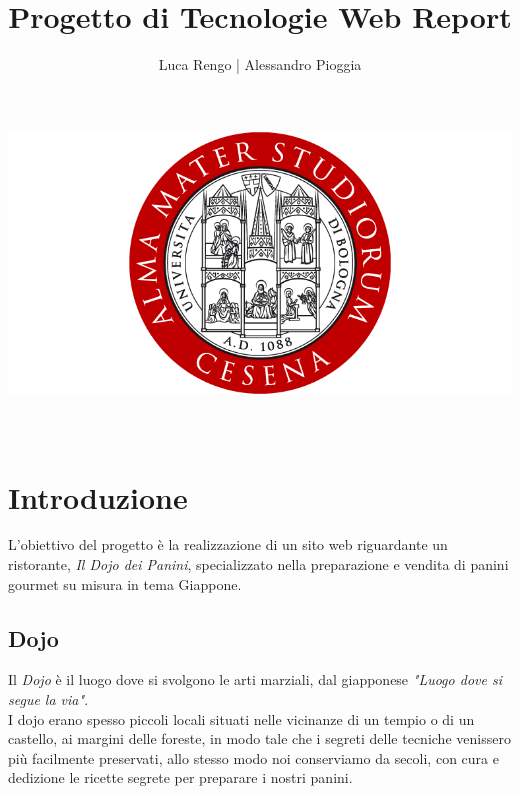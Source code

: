 \documentclass[a4paper,12pt]{report}
\title{\textbf{Progetto di Tecnologie Web Report}}
\author{Luca Rengo | Alessandro Pioggia}
\begin{document}
	
	\makeatletter
	\begin{titlepage}
		\begin{center}
			\includegraphics[width=0.7\linewidth]{Images/logo/alma_mater_studiorum_cesena_logo.png}\\[4ex]
			{\Huge  \@title }\\[3ex] 
			{\large  \@author}\\[3ex] 
			{\large \@date}
		\end{center}
	\end{titlepage}
	\makeatother
	\thispagestyle{empty}
	\newpage
	
	
	\tableofcontents

	\newpage
	
	
	\section{Introduzione}
	\textsf{\small L'obiettivo del progetto è la realizzazione di un sito web riguardante un ristorante, \emph{Il Dojo dei Panini}, specializzato nella preparazione e vendita di panini gourmet su misura in tema Giappone.}
	\subsection{Dojo}
	\textsf{\small Il \emph{Dojo} è il luogo dove si svolgono le arti marziali, dal giapponese \emph{"Luogo dove si segue la via"}.}\\
	\textsf{\small I dojo erano spesso piccoli locali situati nelle vicinanze di un tempio o di un castello, ai margini delle foreste, in modo tale che i segreti delle tecniche venissero più facilmente preservati, allo stesso modo noi conserviamo da secoli, con cura e dedizione le ricette segrete per preparare i nostri panini.}\\
	
\end{document}
